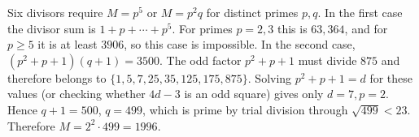 Six divisors require $M=p^5$ or $M=p^2q$ for distinct primes $p,q$. In the first case the divisor sum is $1+p+\cdots+p^5$. For primes $p=2,3$ this is $63,364$, and for $p\ge5$ it is at least $3906$, so this case is impossible. In the second case, $(p^2+p+1)(q+1)=3500$. The odd factor $p^2+p+1$ must divide $875$ and therefore belongs to $\{1,5,7,25,35,125,175,875\}$. Solving $p^2+p+1=d$ for these values (or checking whether $4d-3$ is an odd square) gives only $d=7,p=2$. Hence $q+1=500$, $q=499$, which is prime by trial division through $\sqrt{499}<23$. Therefore $\boxed{M=2^2\cdot499=1996}$.
